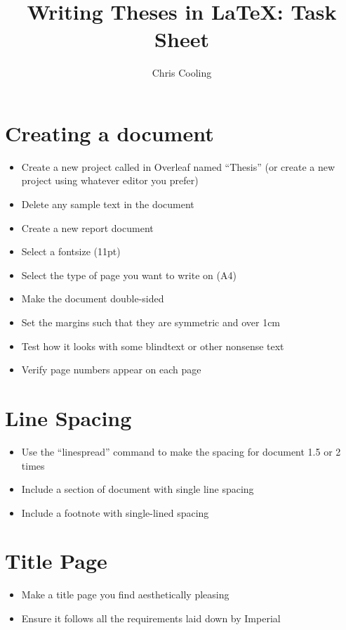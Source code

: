\documentclass[11pt,a4paper]{article}
\begin{document}
\title{Writing Theses in \LaTeX: Task Sheet}
\author{Chris Cooling}
\maketitle
\pagestyle{empty}
\thispagestyle{empty}

\section{Creating a document}
\begin{itemize}
\item Create a new project called in Overleaf named ``Thesis'' (or create a new project using whatever editor you prefer)
\item Delete any sample text in the document
\item Create a new report document
\item Select a fontsize (11pt)
\item Select the type of page you want to write on (A4)
\item Make the document double-sided
\item Set the margins such that they are symmetric and over 1cm
\item Test how it looks with some blindtext or other nonsense text
\item Verify page numbers appear on each page
\end{itemize}

\section{Line Spacing}
\begin{itemize}
\item Use the ``linespread'' command to make the spacing for document 1.5 or 2 times
\item Include a section of document with single line spacing
\item Include a footnote with single-lined spacing
\end{itemize}

\section{Title Page}
\begin{itemize}
\item Make a title page you find aesthetically pleasing
\item Ensure it follows all the requirements laid down by Imperial
\end{itemize}
\end{document}
